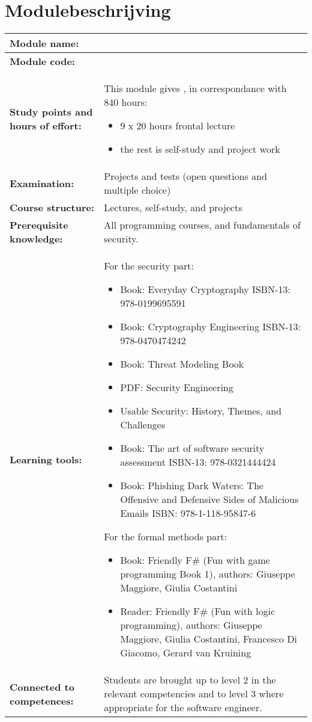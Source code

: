 \section*{Modulebeschrijving}
\begin{tabularx}{\textwidth}{|>{\columncolor{lichtGrijs}} p{}|X|}
	\hline
	\textbf{Module name:} & \modulenaam\\
	\hline
	\textbf{Module code: }& \modulecode\\
	\hline
	\textbf{Study points \newline and hours of effort:} & This module gives \stdPunten, in correspondance with 840 hours:
	\begin{itemize}
		\item 9 x 20 hours frontal lecture
		\item the rest is self-study and project work
	\end{itemize} \\
	\hline
	\textbf{Examination:} & Projects and tests (open questions and multiple choice) \\
	\hline
	\textbf{Course structure:} & Lectures, self-study, and projects \\
	\hline
	\textbf{Prerequisite knowledge:} & All programming courses, and fundamentals of security. \\
	\hline
	\textbf{Learning tools:}  &
		For the security part:
		\begin{itemize}
			\item Book: Everyday Cryptography ISBN-13: 978-0199695591
			\item Book: Cryptography Engineering ISBN-13: 978-0470474242
			\item Book: Threat Modeling Book
			\item PDF: Security Engineering
			\item Usable Security: History, Themes, and Challenges
			\item Book: The art of software security assessment ISBN-13: 978-0321444424
			\item Book: Phishing Dark Waters: The Offensive and Defensive Sides of Malicious Emails ISBN: 978-1-118-95847-6
		\end{itemize}
	
		For the formal methods part:
		\begin{itemize}
			\item Book: Friendly F\# (Fun with game programming Book 1), authors: Giuseppe Maggiore, Giulia Costantini
			\item Reader: Friendly F\# (Fun with logic programming), authors: Giuseppe Maggiore, Giulia Costantini, Francesco Di Giacomo, Gerard van Kruining
		\end{itemize} \\
	\hline
	\textbf{Connected to \newline competences:} &
		Students are brought up to level 2 in the relevant competencies and to level 3 where appropriate for the software engineer. \\
	\hline
\end{tabularx}
\newpage

